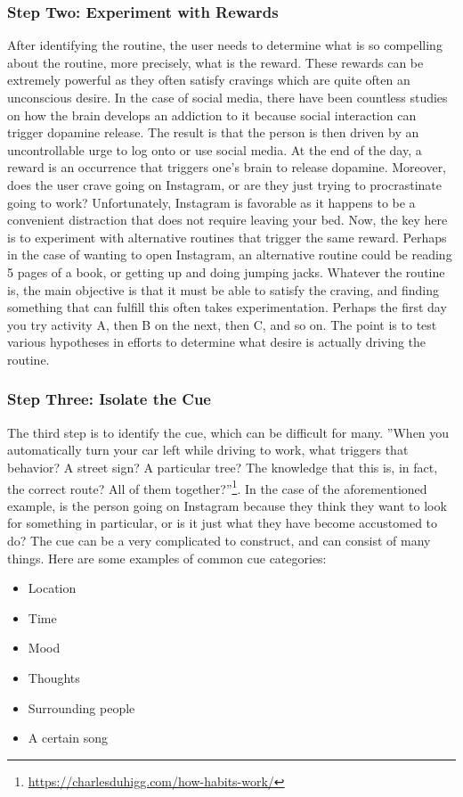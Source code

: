 \subsubsection*{Step Two: Experiment with Rewards}
After identifying the routine, the user needs to determine what is so compelling about the routine, more precisely, what is the reward. These rewards can be extremely powerful as they often satisfy cravings which are quite often an unconscious desire. In the case of social media, there have been countless studies on how the brain develops an addiction to it because social interaction can trigger dopamine release. The result is that the person is then driven by an uncontrollable urge to log onto or use social media. At the end of the day, a reward is an occurrence that triggers one’s brain to release dopamine. Moreover, does the user crave going on Instagram, or are they just trying to procrastinate going to work? Unfortunately, Instagram is favorable as it happens to be a convenient distraction that does not require leaving your bed.
\newline \newline
Now, the key here is to experiment with alternative routines that trigger the same reward. Perhaps in the case of wanting to open Instagram, an alternative routine could be reading 5 pages of a book, or getting up and doing jumping jacks. Whatever the routine is, the main objective is that it must be able to satisfy the craving, and finding something that can fulfill this often takes experimentation. Perhaps the first day you try activity A, then B on the next, then C, and so on. The point is to test various hypotheses in efforts to determine what desire is actually driving the routine. 
\subsubsection*{Step Three: Isolate the Cue}
The third step is to identify the cue, which can be difficult for many. ”When you automatically turn your car left while driving to work, what triggers that behavior? A street sign? A particular tree? The knowledge that this is, in fact, the correct route? All of them together?”\footnote{\url{https://charlesduhigg.com/how-habits-work/}}. In the case of the aforementioned example, is the person going on Instagram because they think they want to look for something in particular, or is it just what they have become accustomed to do? The cue can be a very complicated to construct, and can consist of many things. Here are some examples of common cue categories:
\begin{itemize}
    \item Location
    \item Time
    \item Mood
    \item Thoughts
    \item Surrounding people
    \item A certain song
\end{itemize}
